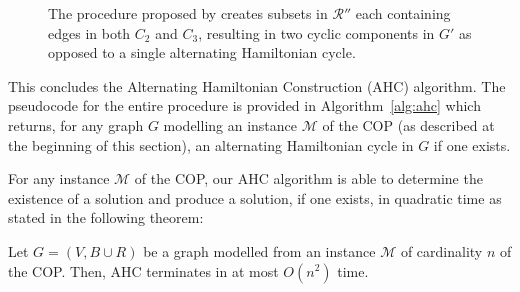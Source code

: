 \documentclass[a4paper,11pt,authoryear]{elsarticle}
\begin{document}
\begin{figure}[h!]
	\centering	
	\begin{subfigure}[h]{0.35\textwidth}
		
		\caption{}
		\label{fig:bcrerror}
	\end{subfigure} \hspace{5mm}
	\begin{subfigure}[h]{0.25\textwidth}
		
		\caption{}
		\label{fig:mpsconnecterror}
	\end{subfigure} \hspace{5mm}
	\begin{subfigure}[h]{0.25\textwidth}
		
		\caption{}
		\label{fig:mpscycleerror}
	\end{subfigure}
	\caption{The procedure proposed by \cite{becker2010} creates subsets in $\mathcal{R}''$ each containing edges in both $C_2$ and $C_3$, resulting in two cyclic components in $G'$ as opposed to a single alternating Hamiltonian cycle.}	
	\label{fig:overlaperror}
\end{figure}


This concludes the Alternating Hamiltonian Construction (AHC) algorithm. The pseudocode for the entire procedure is provided in Algorithm~\ref{alg:ahc} which returns, for any graph $G$ modelling an instance $\mathcal{M}$ of the COP (as described at the beginning of this section), an alternating Hamiltonian cycle in $G$ if one exists.

For any instance $\mathcal{M}$ of the COP, our AHC algorithm is able to determine the existence of a solution and produce a solution, if one exists, in quadratic time as stated in the following theorem:

\begin{theorem}
	Let $G=(V, B \cup R)$ be a graph modelled from an instance $\mathcal{M}$ of cardinality $n$ of the COP. Then, AHC terminates in at most $O(n^2)$ time.
	\label{thm:ahc}
\end{theorem}
\end{document}
